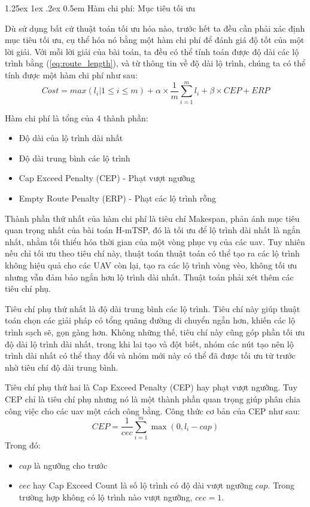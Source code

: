 \documentclass[a4paper]{article}
\makeatletter
\renewcommand{\paragraph}{%
  \@startsection{paragraph}{4}{\z@}%
  {1.25ex \@plus 1ex \@minus .2ex}%
  {0.5em}%
  {\normalfont\normalsize\bfseries}%
}
\makeatother
\begin{document}
\paragraph{Hàm chi phí: Mục tiêu tối ưu}

Dù sử dụng bất cứ thuật toán tối ưu hóa nào, trước hết ta đều cần phải xác định mục tiêu tối ưu, cụ thể hóa nó bằng một hàm chi phí để đánh giá độ tốt của một lời giải. Với mỗi lời giải của bài toán, ta đều có thể tính toán được độ dài các lộ trình bằng (\ref{eq:route_length}), và từ thông tin về độ dài lộ trình, chúng ta có thể tính được một hàm chi phí như sau:
\begin{equation}
Cost = max(l_i | 1\le i \le m) + \alpha \times \frac 1m\sum_{i=1}^{m} l_i + \beta \times CEP + ERP
\end{equation}

Hàm chi phí là tổng của 4 thành phần:
\begin{itemize}
  \item Độ dài của lộ trình dài nhất 
  \item Độ dài trung bình các lộ trình
  \item Cap Exceed Penalty (CEP) - Phạt vượt ngưỡng
  \item Empty Route Penalty (ERP) - Phạt các lộ trình rỗng
\end{itemize}

Thành phần thứ nhất của hàm chi phí là tiêu chí Makespan, phản ánh mục tiêu quan trọng nhất của bài toán H-mTSP, đó là tối ưu để lộ trình dài nhất là ngắn nhất, nhằm tối thiểu hóa thời gian của một vòng phục vụ của các uav.
Tuy nhiên nếu chỉ tối ưu theo tiêu chí này, thuật toán thuật toán có thể tạo ra các lộ trình không hiệu quả cho các UAV còn lại, tạo ra các lộ trình vòng vèo, không tối ưu nhưng vẫn đảm bảo ngắn hơn lộ trình dài nhất. Thuật toán phải xét thêm các tiêu chí phụ. 

Tiêu chí phụ thứ nhất là độ dài trung bình các lộ trình. Tiêu chí này giúp thuật toán chọn các giải pháp có tổng quãng đường di chuyển ngắn hơn, khiến các lộ trình sạch sẽ, gọn gàng hơn. Không những thế, tiêu chí này cũng góp phần tối ưu độ dài lộ trình dài nhất, trong khi lai tạo và đột biết, nhóm các nút tạo nên lộ trình dài nhất có thể thay đổi và nhóm mới này có thể đã được tối ưu từ trước nhờ tiêu chí độ dài trung bình.

Tiêu chí phụ thứ hai là Cap Exceed Penalty (CEP) hay phạt vượt ngưỡng. Tuy CEP chỉ là tiêu chí phụ nhưng nó là một thành phần quan trọng giúp phân chia công việc cho các uav một cách công bằng. Công thức cơ bản của CEP như sau:
\begin{equation}
CEP = \frac 1 {cec} \sum_{i=1}^{m} \max(0, l_i - cap)
\end{equation}
Trong đó:
\begin{itemize}
  \item $cap$ là ngưỡng cho trước
  \item $cec$ hay Cap Exceed Count là số lộ trình có độ dài vượt ngưỡng $cap$. Trong trường hợp không có lộ trình nào vượt ngưỡng, $cec = 1$.
\end{itemize}
\end{document}
